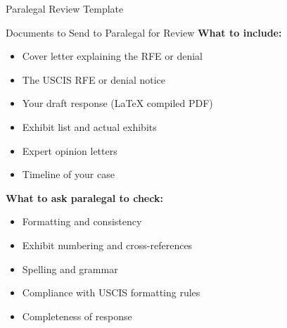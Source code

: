 \documentclass[11pt]{beamer}
\begin{document}
	
	\begin{frame}{Paralegal Review Template}
		\scriptsize
		\begin{block}{Documents to Send to Paralegal for Review}
			\textbf{What to include:}
			\begin{itemize}
				\item Cover letter explaining the RFE or denial
				\item The USCIS RFE or denial notice
				\item Your draft response (LaTeX compiled PDF)
				\item Exhibit list and actual exhibits
				\item Expert opinion letters
				\item Timeline of your case
			\end{itemize}
			\textbf{What to ask paralegal to check:}
			\begin{itemize}
				\item Formatting and consistency
				\item Exhibit numbering and cross-references
				\item Spelling and grammar
				\item Compliance with USCIS formatting rules
				\item Completeness of response
			\end{itemize}
		\end{block}
	\end{frame}
	
	
\end{document}
